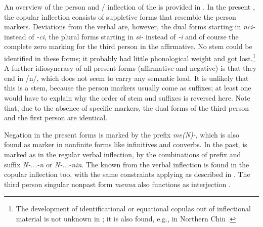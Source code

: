 An overview of the person and / inflection of the  is provided in . In the present , the copular inflection consists of suppletive forms that resemble the person markers. Deviations from  the verbal  are, however, the dual forms starting in \emph{nci-} instead of \emph{-ci}, the plural forms starting in  \emph{si-} instead of  \emph{-i} and of course the complete zero marking for the third person in the affirmative. No stem could be identified in these forms; it probably had little phonological weight and got lost.\footnote{The development of identificational or equational copulas out of inflectional material is not unknown in ; it is also found, e.g., in Northern Chin \cite[9]{DeLancey2011_Notes}.}  A further idiosyncrasy of all present forms (affirmative and negative) is that they end in /n/, which does not seem to carry any semantic load. It is unlikely that this is a stem, because the person markers usually come as suffixes; at least one would have to explain why the order of stem and suffixes is reversed here.  Note that, due to the absence of specific markers, the dual forms of the third person and the first person  are identical.

\largerpage
Negation in the present forms is marked by the prefix \emph{me(N)-}, which is also found as  marker in nonfinite forms like infinitives and converbs. In the past,  is marked as in the regular verbal inflection, by the combinations of prefix and suffix \emph{N-...-n} or \emph{N-...-nin}. The  known from the verbal inflection is found in the copular inflection too, with the same constraints applying as described in . The third person singular nonpast form \emph{menna} also functions as interjection . 


